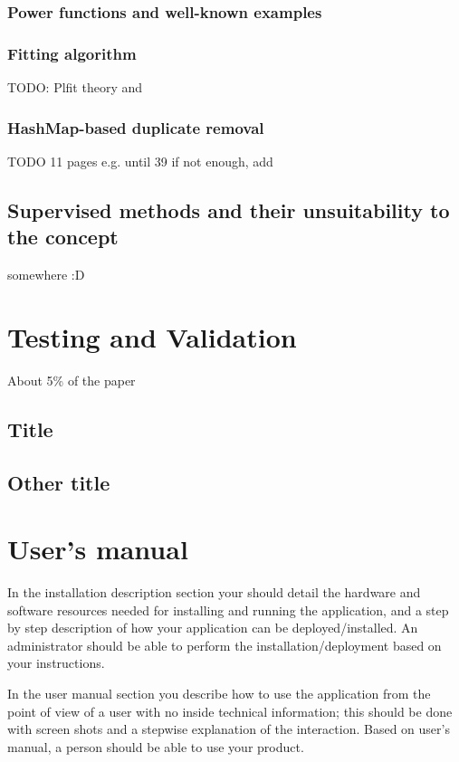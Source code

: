 \documentclass[12pt,a4paper,twoside]{report}
\begin{document}
\subsection{Power functions and well-known examples}
\subsection{Fitting algorithm}
\label{plfittheory}
TODO: Plfit theory and \cite{clauset2009power}

\subsection{HashMap-based duplicate removal}
{\color{red}TODO 11 pages e.g. until 39
if not enough, add
\section{Supervised methods and their unsuitability to the concept}
somewhere :D}



\chapter{Testing and Validation}

About 5\% of the paper
\section{Title}
\section{Other title}

\chapter{User's manual}

In the installation description section your should detail the hardware and software resources needed for installing and running the application, and a step by step description of how your application can be deployed/installed. An administrator should be able to perform the installation/deployment based on your instructions.

In the user manual section you describe how to use the application from the point of view of a user with no inside technical information; this should be done with screen shots and a stepwise explanation of the interaction. Based on user's manual, a person should be able to use your product.
\end{document}
